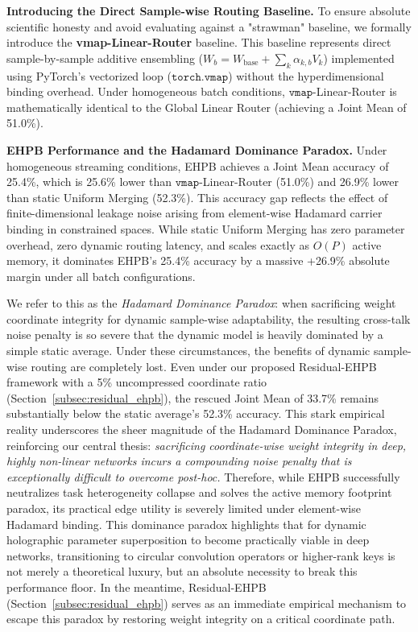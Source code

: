 \textbf{Introducing the Direct Sample-wise Routing Baseline.} To ensure absolute scientific honesty and avoid evaluating against a "strawman" baseline, we formally introduce the \textbf{vmap-Linear-Router} baseline. This baseline represents direct sample-by-sample additive ensembling ($W_b = W_{\text{base}} + \sum_k \alpha_{k,b} V_k$) implemented using PyTorch's vectorized loop ($\mathtt{torch.vmap}$) without the hyperdimensional binding overhead. Under homogeneous batch conditions, $\mathtt{vmap}$-Linear-Router is mathematically identical to the Global Linear Router (achieving a Joint Mean of 51.0\%). 

\textbf{EHPB Performance and the Hadamard Dominance Paradox.} Under homogeneous streaming conditions, EHPB achieves a Joint Mean accuracy of 25.4\%, which is 25.6\% lower than $\mathtt{vmap}$-Linear-Router (51.0\%) and 26.9\% lower than static Uniform Merging (52.3\%). This accuracy gap reflects the effect of finite-dimensional leakage noise arising from element-wise Hadamard carrier binding in constrained spaces. While static Uniform Merging has zero parameter overhead, zero dynamic routing latency, and scales exactly as $O(P)$ active memory, it dominates EHPB's 25.4\% accuracy by a massive +26.9\% absolute margin under all batch configurations. 

We refer to this as the \textit{Hadamard Dominance Paradox}: when sacrificing weight coordinate integrity for dynamic sample-wise adaptability, the resulting cross-talk noise penalty is so severe that the dynamic model is heavily dominated by a simple static average. Under these circumstances, the benefits of dynamic sample-wise routing are completely lost. Even under our proposed Residual-EHPB framework with a 5\% uncompressed coordinate ratio (Section~\ref{subsec:residual_ehpb}), the rescued Joint Mean of 33.7\% remains substantially below the static average's 52.3\% accuracy. This stark empirical reality underscores the sheer magnitude of the Hadamard Dominance Paradox, reinforcing our central thesis: \textit{sacrificing coordinate-wise weight integrity in deep, highly non-linear networks incurs a compounding noise penalty that is exceptionally difficult to overcome post-hoc.} Therefore, while EHPB successfully neutralizes task heterogeneity collapse and solves the active memory footprint paradox, its practical edge utility is severely limited under element-wise Hadamard binding. This dominance paradox highlights that for dynamic holographic parameter superposition to become practically viable in deep networks, transitioning to circular convolution operators or higher-rank keys is not merely a theoretical luxury, but an absolute necessity to break this performance floor. In the meantime, Residual-EHPB (Section~\ref{subsec:residual_ehpb}) serves as an immediate empirical mechanism to escape this paradox by restoring weight integrity on a critical coordinate path. 

